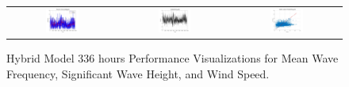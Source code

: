 \begin{figure}[ht!]
\begin{tabular}{ccc}
    \includegraphics[width=0.32\textwidth]{graphs/hybrid/336 hours/wind_speed/actual vs forecast.jpg} &
    \includegraphics[width=0.32\textwidth]{graphs/hybrid/336 hours/wind_speed/residuals.jpg} &
    \includegraphics[width=0.32\textwidth]{graphs/hybrid/336 hours/wind_speed/scatter plot.jpg} \\
  \end{tabular}
  \caption{Hybrid Model 336 hours Performance Visualizations for Mean Wave Frequency, Significant Wave Height, and Wind Speed.}
  \label{fig:hybrid_336_hours}
\end{figure}

